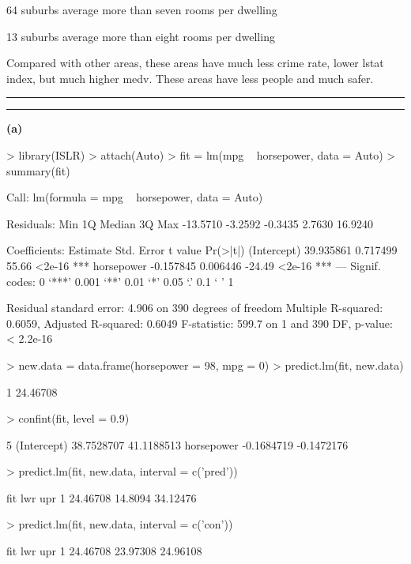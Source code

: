 \documentclass[a4paper]{article}
\newcommand{\question}[2] {\vspace{.25in} \hrule\vspace{0.5em}
\noindent{\bf #1: #2} \vspace{0.5em}
\hrule \vspace{.10in}}
\renewcommand{\part}[1] {\vspace{.10in} {\bf (#1)}}
\begin{document}
\begin{enumerate}
{\color{red}
\item 64 suburbs average more than seven rooms per dwelling
\item 13 suburbs average more than eight rooms per dwelling
\item Compared with other areas, these areas have much less crime rate, lower lstat index, but much higher medv. These areas have less people and much safer.
}
\end{enumerate}



\question{8}{lm on Auto}
\part{a}
\begin{Schunk}
\begin{Sinput}
> library(ISLR)
> attach(Auto)
> fit = lm(mpg ~ horsepower, data = Auto)
> summary(fit)
\end{Sinput}
\begin{Soutput}
Call:
lm(formula = mpg ~ horsepower, data = Auto)

Residuals:
     Min       1Q   Median       3Q      Max 
-13.5710  -3.2592  -0.3435   2.7630  16.9240 

Coefficients:
             Estimate Std. Error t value Pr(>|t|)    
(Intercept) 39.935861   0.717499   55.66   <2e-16 ***
horsepower  -0.157845   0.006446  -24.49   <2e-16 ***
---
Signif. codes:  0 ‘***’ 0.001 ‘**’ 0.01 ‘*’ 0.05 ‘.’ 0.1 ‘ ’ 1

Residual standard error: 4.906 on 390 degrees of freedom
Multiple R-squared:  0.6059,	Adjusted R-squared:  0.6049 
F-statistic: 599.7 on 1 and 390 DF,  p-value: < 2.2e-16
\end{Soutput}
\begin{Sinput}
> new.data = data.frame(horsepower = 98, mpg = 0)
> predict.lm(fit, new.data)
\end{Sinput}
\begin{Soutput}
       1 
24.46708 
\end{Soutput}
\begin{Sinput}
> confint(fit, level = 0.9)
\end{Sinput}
\begin{Soutput}
                   5 %
(Intercept) 38.7528707 41.1188513
horsepower  -0.1684719 -0.1472176
\end{Soutput}
\begin{Sinput}
> predict.lm(fit, new.data, interval = c('pred'))
\end{Sinput}
\begin{Soutput}
       fit     lwr      upr
1 24.46708 14.8094 34.12476
\end{Soutput}
\begin{Sinput}
> predict.lm(fit, new.data, interval = c('con'))
\end{Sinput}
\begin{Soutput}
       fit      lwr      upr
1 24.46708 23.97308 24.96108
\end{Soutput}
\end{Schunk}
\end{document}
